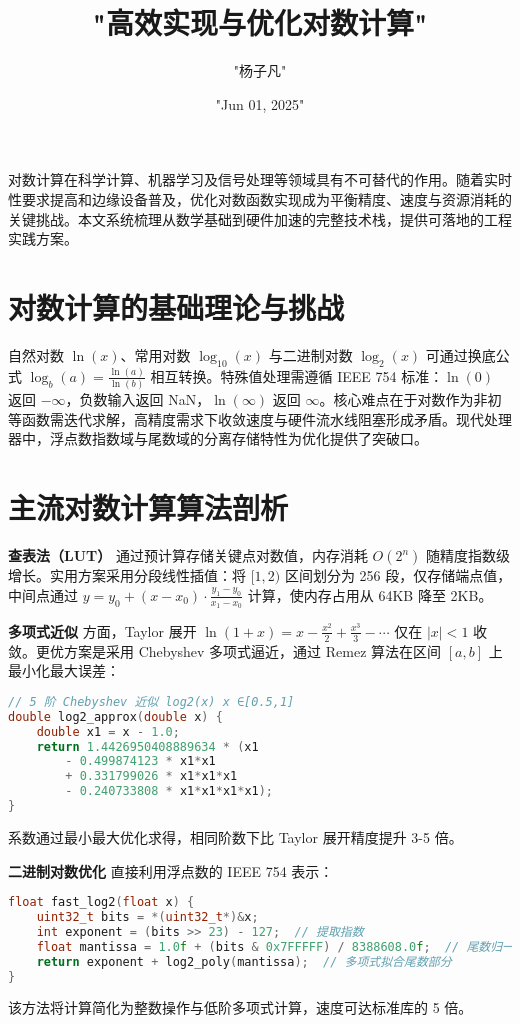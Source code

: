 \title{"高效实现与优化对数计算"}
\author{"杨子凡"}
\date{"Jun 01, 2025"}
\maketitle
对数计算在科学计算、机器学习及信号处理等领域具有不可替代的作用。随着实时性要求提高和边缘设备普及，优化对数函数实现成为平衡精度、速度与资源消耗的关键挑战。本文系统梳理从数学基础到硬件加速的完整技术栈，提供可落地的工程实践方案。\par
\chapter{对数计算的基础理论与挑战}
自然对数 $\ln(x)$、常用对数 $\log_{10}(x)$ 与二进制对数 $\log_2(x)$ 可通过换底公式 $\log_b(a) = \frac{\ln(a)}{\ln(b)}$ 相互转换。特殊值处理需遵循 IEEE 754 标准：$\ln(0)$ 返回 $-\infty$，负数输入返回 NaN，$\ln(\infty)$ 返回 $\infty$。核心难点在于对数作为非初等函数需迭代求解，高精度需求下收敛速度与硬件流水线阻塞形成矛盾。现代处理器中，浮点数指数域与尾数域的分离存储特性为优化提供了突破口。\par
\chapter{主流对数计算算法剖析}
\textbf{查表法（LUT）} 通过预计算存储关键点对数值，内存消耗 $O(2^n)$ 随精度指数级增长。实用方案采用分段线性插值：将 $[1,2)$ 区间划分为 256 段，仅存储端点值，中间点通过 $y = y_0 + (x-x_0) \cdot \frac{y_1-y_0}{x_1-x_0}$ 计算，使内存占用从 64KB 降至 2KB。\par
\textbf{多项式近似} 方面，Taylor 展开 $\ln(1+x) = x - \frac{x^2}{2} + \frac{x^3}{3} - \cdots$ 仅在 $|x| < 1$ 收敛。更优方案是采用 Chebyshev 多项式逼近，通过 Remez 算法在区间 $[a,b]$ 上最小化最大误差：\par
\begin{lstlisting}[language=cpp]
// 5 阶 Chebyshev 近似 log2(x) x ∈[0.5,1]
double log2_approx(double x) {
    double x1 = x - 1.0;
    return 1.4426950408889634 * (x1 
        - 0.499874123 * x1*x1 
        + 0.331799026 * x1*x1*x1
        - 0.240733808 * x1*x1*x1*x1);
}
\end{lstlisting}
系数通过最小最大优化求得，相同阶数下比 Taylor 展开精度提升 3-5 倍。\par
\textbf{二进制对数优化} 直接利用浮点数的 IEEE 754 表示：\par
\begin{lstlisting}[language=c]
float fast_log2(float x) {
    uint32_t bits = *(uint32_t*)&x;
    int exponent = (bits >> 23) - 127;  // 提取指数
    float mantissa = 1.0f + (bits & 0x7FFFFF) / 8388608.0f;  // 尾数归一化
    return exponent + log2_poly(mantissa);  // 多项式拟合尾数部分
}
\end{lstlisting}
该方法将计算简化为整数操作与低阶多项式计算，速度可达标准库的 5 倍。\par
